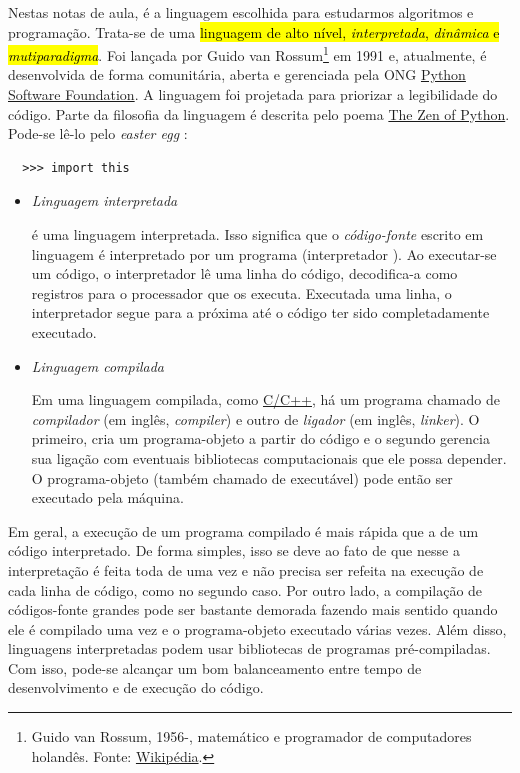 Nestas notas de aula, \hl{{\python}} é a linguagem escolhida para estudarmos algoritmos e programação. Trata-se de uma \hl{linguagem de alto nível, \emph{interpretada}, \emph{dinâmica} e \emph{mutiparadigma}}. Foi lançada por Guido van Rossum\footnote{Guido van Rossum, 1956-, matemático e programador de computadores holandês. Fonte: \href{https://pt.wikipedia.org/wiki/Guido\_van\_Rossum}{Wikipédia}.} em 1991 e, atualmente, é desenvolvida de forma comunitária, aberta e gerenciada pela ONG \href{https://pt.wikipedia.org/wiki/Python_Software_Foundation}{Python Software Foundation}. A linguagem foi projetada para priorizar a legibilidade do código. Parte da filosofia da linguagem é descrita pelo poema \href{https://pt.wikipedia.org/wiki/Zen_de_Python}{The Zen of Python}. Pode-se lê-lo pelo {\it easter egg} {\python}:
\begin{lstlisting}
  >>> import this
\end{lstlisting}

\begin{itemize}
\item \emph{Linguagem interpretada}

  {\python} é uma linguagem interpretada. Isso significa que o \emph{código-fonte} escrito em linguagem {\python} é interpretado por um programa (interpretador {\python}). Ao executar-se um código, o interpretador lê uma linha do código, decodifica-a como registros para o processador que os executa. Executada uma linha, o interpretador segue para a próxima até o código ter sido completadamente executado.

\item \emph{Linguagem compilada}

  Em uma linguagem compilada, como \href{https://pt.wikipedia.org/wiki/C\%2B\%2B}{C/C++}, há um programa chamado de \emph{compilador} (em inglês, {\it compiler}) e outro de \emph{ligador} (em inglês, {\it linker}). O primeiro, cria um programa-objeto a partir do código e o segundo gerencia sua ligação com eventuais bibliotecas computacionais que ele possa depender. O programa-objeto (também chamado de executável) pode então ser executado pela máquina.
\end{itemize}

Em geral, a execução de um programa compilado é mais rápida que a de um código interpretado. De forma simples, isso se deve ao fato de que nesse a interpretação é feita toda de uma vez e não precisa ser refeita na execução de cada linha de código, como no segundo caso. Por outro lado, a compilação de códigos-fonte grandes pode ser bastante demorada fazendo mais sentido quando ele é compilado uma vez e o programa-objeto executado várias vezes. Além disso, linguagens interpretadas podem usar bibliotecas de programas pré-compiladas. Com isso, pode-se alcançar um bom balanceamento entre tempo de desenvolvimento e de execução do código.

